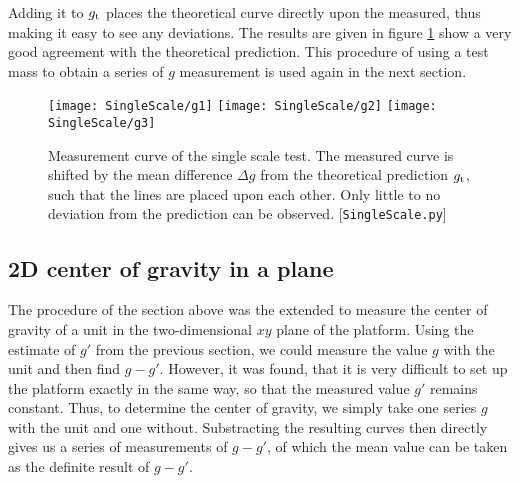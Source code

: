 \documentclass[journal]{IEEEtran}
\begin{document}
Adding it to $g_{\textup{t}}$ places the theoretical curve directly upon the measured, thus making it easy to see any deviations.
The results are given in figure \ref{fig:SingleScale} show a very good agreement with the theoretical prediction.
This procedure of using a test mass to obtain a series of $g$ measurement is used again in the next section.

\begin{figure}
	\centering
	\texttt{[image: SingleScale/g1]}
	\texttt{[image: SingleScale/g2]}
	\texttt{[image: SingleScale/g3]}
	\caption{Measurement curve of the single scale test. The measured curve is shifted by the mean difference $\Delta g$ from the theoretical prediction $g_{\textup{t}}$, such that the lines are placed upon each other. Only little to no deviation from the prediction can be observed. [\texttt{SingleScale.py}]}
	\label{fig:SingleScale}
\end{figure}

\subsection{2D center of gravity in a plane}
\label{sec:2DCoG}

The procedure of the section above was the extended to measure the center of gravity of a unit in the two-dimensional $xy$ plane of the platform.
Using the estimate of $g'$ from the previous section, we could measure the value $g$ with the unit and then find $g-g'$.
However, it was found, that it is very difficult to set up the platform exactly in the same way, so that the measured value $g'$ remains constant.
Thus, to determine the center of gravity, we simply take one series $g$ with the unit and one without.
Substracting the resulting curves then directly gives us a series of measurements of $g-g'$, of which the mean value can be taken as the definite result of $g-g'$.
\end{document}
